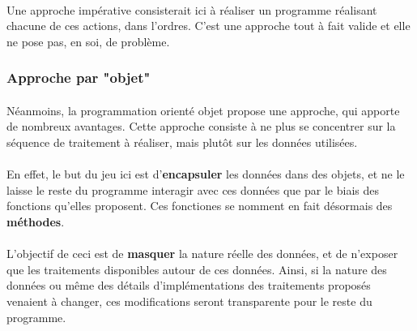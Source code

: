 {  \bizProcessExemple

  \paragraph{} Une approche impérative consisterait ici à réaliser un programme réalisant chacune de
  ces actions, dans l'ordres. C'est une approche tout à fait valide et elle ne pose pas, en soi, de
  problème.

  \subsubsection{Approche par "objet"}

  \paragraph{} Néanmoins, la programmation orienté objet propose une approche, qui apporte de nombreux
  avantages. Cette approche consiste à ne plus se concentrer sur la séquence de traitement à réaliser,
  mais plutôt sur les données utilisées.

  \paragraph{} En effet, le but du jeu ici est d'\textbf{encapsuler} les données dans des objets, et
  ne le laisse le reste du programme interagir avec ces données que par le biais des fonctions
  qu'elles proposent. Ces fonctiones se nomment en fait désormais des \textbf{méthodes}.

  \paragraph{} L'objectif de ceci est de \textbf{masquer} la nature réelle des données, et de
  n'exposer que les traitements disponibles autour de ces données. Ainsi, si la nature des données ou
  même des détails d'implémentations des traitements proposés venaient à changer, ces modifications
  seront transparente pour le reste du programme.
}


